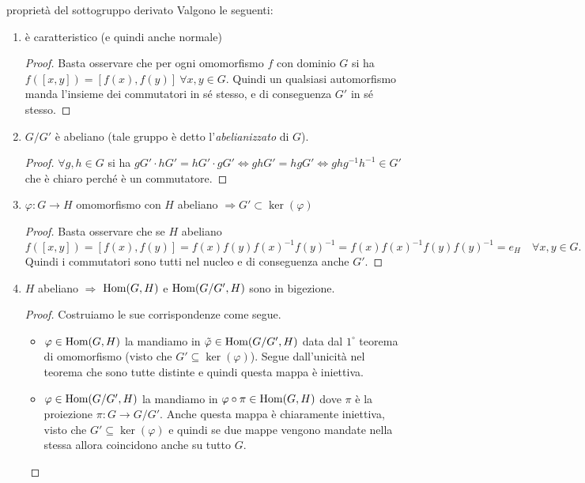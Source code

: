 \begin{proposition}{proprietà del sottogruppo derivato}
    Valgono le seguenti:
    \begin{enumerate}
        \item è caratteristico (e quindi anche normale)
        \begin{proof}
            Basta osservare che per ogni omomorfismo $f$ con dominio $G$ si ha $f([x,y]) = [f(x),f(y)] \ \forall x,y \in G$. Quindi un qualsiasi automorfismo manda l'insieme dei commutatori in sé stesso, e di conseguenza $G'$ in sé stesso.
        \end{proof}
        
        \item $G/G'$ è abeliano (tale gruppo è detto l'\textit{abelianizzato} di $G$).
        \begin{proof}
            $\forall g,h \in G$ si ha $gG' \cdot hG' =  hG' \cdot gG' \iff gh G' = hgG' \iff ghg^{-1}h^{-1} \in G'$ che è chiaro perché è un commutatore.
        \end{proof}
        
        \item $\varphi: G \rightarrow H$ omomorfismo con $H$ abeliano $\Rightarrow G' \subset \ker(\varphi)$
        \begin{proof}
            Basta osservare che se $H$ abeliano
            \[
                f([x,y]) = [f(x),f(y)] = f(x)f(y)f(x)^{-1}f(y)^{-1} = f(x)f(x)^{-1}f(y)f(y)^{-1} = e_H \quad \forall x,y \in G.
            \]
            Quindi i commutatori sono tutti nel nucleo e di conseguenza anche $G'$.
        \end{proof}
        
        \item $H$ abeliano $\Rightarrow$ $\text{Hom}(G,H)$ e $\text{Hom}(G/G',H)$ sono in bigezione.
        \begin{proof}
            Costruiamo le sue corrispondenze come segue. 
            \begin{itemize}
            \item $\varphi \in \text{Hom}(G,H)$ la mandiamo in $\tilde \varphi \in \text{Hom}(G/G',H)$ data dal $1^{\circ}$ teorema di omomorfismo (visto che $G' \subseteq \ker(\varphi)$). Segue dall'unicità nel teorema che sono tutte distinte e quindi questa mappa è iniettiva.
            \item $\varphi \in \text{Hom}(G/G',H)$ la mandiamo in $\varphi \circ \pi \in \text{Hom}(G,H)$ dove $\pi$ è la proiezione $\pi: G \rightarrow G/G'$. Anche questa mappa è chiaramente iniettiva, visto che $G' \subseteq \ker(\varphi)$ e quindi se due mappe vengono mandate nella stessa allora coincidono anche su tutto $G$.
            \end{itemize}
        \end{proof}
        \end{enumerate}    
\end{proposition}

